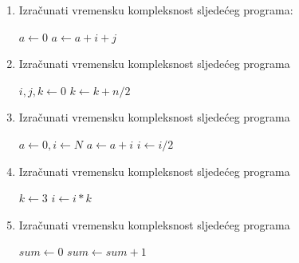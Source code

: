 \begin{enumerate}
	\item Izračunati vremensku kompleksnost sljedećeg programa:
	
	\begin{algorithm}[H]
		\begin{algorithmic}[1]
		    \State $ a \gets  0$
		    		\State $a \gets  a + i + j$
		         \EndFor
		     \EndFor
	    \EndProcedure	 	    
		\end{algorithmic}
	\end{algorithm}
\item Izračunati vremensku kompleksnost sljedećeg programa 
	\begin{algorithm}[H]
	\begin{algorithmic}[1]
		\State $i, j, k \gets  0$
				\State $k \gets  k + n / 2$
			\EndFor
		\EndFor
	\EndProcedure	 
	\end{algorithmic}
\end{algorithm}
 \item Izračunati vremensku kompleksnost sljedećeg programa 

	\begin{algorithm}[H]
	\begin{algorithmic}[1]
		\State $a \gets 0, i \gets N$
			\State $a \gets a+ i$
			\State $i \gets i / 2$
		\EndWhile
    \EndProcedure	 
	\end{algorithmic}
\end{algorithm}
 \item Izračunati vremensku kompleksnost sljedećeg programa 

\begin{algorithm}[H]
	\begin{algorithmic}[1]
		\State $k \gets 3$
		    \State $i \gets i * k$
		\EndFor
	   \EndProcedure
	\end{algorithmic}
\end{algorithm}

 \item Izračunati vremensku kompleksnost sljedećeg programa 

\begin{algorithm}[H]
	\begin{algorithmic}[1]
	  \State $sum \gets 0$
                      \State	$sum \gets sum + 1$
                 

\end{algorithmic}
\end{algorithm}
\end{enumerate}

